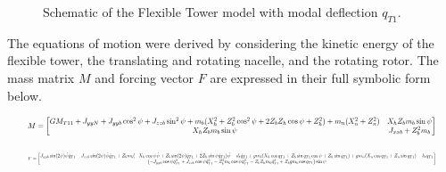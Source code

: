 \documentclass[onecolumn,draftcls]{IEEEtran}
\begin{document}
\begin{figure}[htbp]
    \caption{Schematic of the Flexible Tower model with modal deflection $q_{T1}$.}
    \label{fig:flexible_tower_model}
\end{figure}

The equations of motion were derived by considering the kinetic energy of the flexible tower, the translating and rotating nacelle, and the rotating rotor. The mass matrix $M$ and forcing vector $F$ are expressed in their full symbolic form below.

\begin{equation}
    \label{eq:flex_tower_mass_matrix}
    \resizebox{0.95\textwidth}{!}{%
        $M = \begin{bmatrix}
                GM_{T11} + J_{yy N} + J_{yyb} \cos^{2}\psi + J_{zzb} \sin^{2}\psi + m_{b} (X_{h}^{2} + Z_{b}^{2} \cos^{2}\psi + 2 Z_{b} Z_{h} \cos\psi + Z_{h}^{2}) + m_{n} (X_{n}^{2} + Z_{n}^{2}) & X_{h} Z_{b} m_{b} \sin\psi \\
                X_{h} Z_{b} m_{b} \sin\psi                                                                                                                                                          & J_{xxb} + Z_{b}^{2} m_{b}
            \end{bmatrix}$%
    }
\end{equation}

\begin{equation}
    \label{eq:flex_tower_forcing_terms}
    \resizebox{0.95\textwidth}{!}{%
        $F = \begin{bmatrix}
                J_{yyb} \sin(2 \psi) \dot{\psi} \dot{q}_{T1} - J_{zzb} \sin(2 \psi) \dot{\psi} \dot{q}_{T1} + Z_{b} m_{b} (- X_{h} \cos\psi \dot{\psi} + Z_{b} \sin(2 \psi) \dot{q}_{T1} + 2 Z_{h} \sin\psi \dot{q}_{T1}) \dot{\psi} - d_{t} \dot{q}_{T1} + g m_{b} (X_{h} \cos q_{T1} + Z_{b} \sin q_{T1} \cos\psi + Z_{h} \sin q_{T1}) + g m_{n} (X_{n} \cos q_{T1} + Z_{n} \sin q_{T1}) - k_{t} q_{T1} \\
                \left(- J_{yyb} \cos\psi \dot{q}_{T1}^{2} + J_{zzb} \cos\psi \dot{q}_{T1}^{2} - Z_{b}^{2} m_{b} \cos\psi \dot{q}_{T1}^{2} - Z_{b} Z_{h} m_{b} \dot{q}_{T1}^{2} + Z_{b} g m_{b} \cos q_{T1} \right) \sin\psi
            \end{bmatrix}$%
    }
\end{equation}
\end{document}
